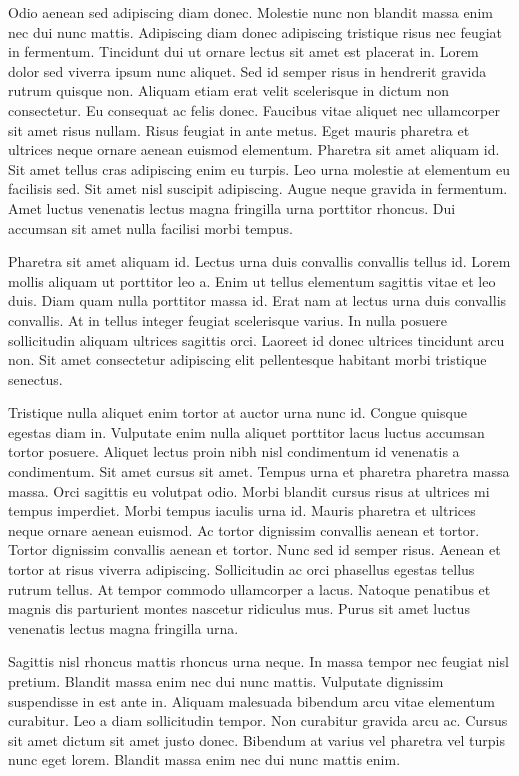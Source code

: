 \documentclass[11pt,a4paper]{article}
\begin{document}
Odio aenean sed adipiscing diam donec. Molestie nunc non blandit massa enim nec dui nunc mattis. Adipiscing diam donec adipiscing tristique risus nec feugiat in fermentum. Tincidunt dui ut ornare lectus sit amet est placerat in. Lorem dolor sed viverra ipsum nunc aliquet. Sed id semper risus in hendrerit gravida rutrum quisque non. Aliquam etiam erat velit scelerisque in dictum non consectetur. Eu consequat ac felis donec. Faucibus vitae aliquet nec ullamcorper sit amet risus nullam. Risus feugiat in ante metus. Eget mauris pharetra et ultrices neque ornare aenean euismod elementum. Pharetra sit amet aliquam id. Sit amet tellus cras adipiscing enim eu turpis. Leo urna molestie at elementum eu facilisis sed. Sit amet nisl suscipit adipiscing. Augue neque gravida in fermentum. Amet luctus venenatis lectus magna fringilla urna porttitor rhoncus. Dui accumsan sit amet nulla facilisi morbi tempus.

Pharetra sit amet aliquam id. Lectus urna duis convallis convallis tellus id. Lorem mollis aliquam ut porttitor leo a. Enim ut tellus elementum sagittis vitae et leo duis. Diam quam nulla porttitor massa id. Erat nam at lectus urna duis convallis convallis. At in tellus integer feugiat scelerisque varius. In nulla posuere sollicitudin aliquam ultrices sagittis orci. Laoreet id donec ultrices tincidunt arcu non. Sit amet consectetur adipiscing elit pellentesque habitant morbi tristique senectus.

Tristique nulla aliquet enim tortor at auctor urna nunc id. Congue quisque egestas diam in. Vulputate enim nulla aliquet porttitor lacus luctus accumsan tortor posuere. Aliquet lectus proin nibh nisl condimentum id venenatis a condimentum. Sit amet cursus sit amet. Tempus urna et pharetra pharetra massa massa. Orci sagittis eu volutpat odio. Morbi blandit cursus risus at ultrices mi tempus imperdiet. Morbi tempus iaculis urna id. Mauris pharetra et ultrices neque ornare aenean euismod. Ac tortor dignissim convallis aenean et tortor. Tortor dignissim convallis aenean et tortor. Nunc sed id semper risus. Aenean et tortor at risus viverra adipiscing. Sollicitudin ac orci phasellus egestas tellus rutrum tellus. At tempor commodo ullamcorper a lacus. Natoque penatibus et magnis dis parturient montes nascetur ridiculus mus. Purus sit amet luctus venenatis lectus magna fringilla urna.

Sagittis nisl rhoncus mattis rhoncus urna neque. In massa tempor nec feugiat nisl pretium. Blandit massa enim nec dui nunc mattis. Vulputate dignissim suspendisse in est ante in. Aliquam malesuada bibendum arcu vitae elementum curabitur. Leo a diam sollicitudin tempor. Non curabitur gravida arcu ac. Cursus sit amet dictum sit amet justo donec. Bibendum at varius vel pharetra vel turpis nunc eget lorem. Blandit massa enim nec dui nunc mattis enim.
\end{document}
